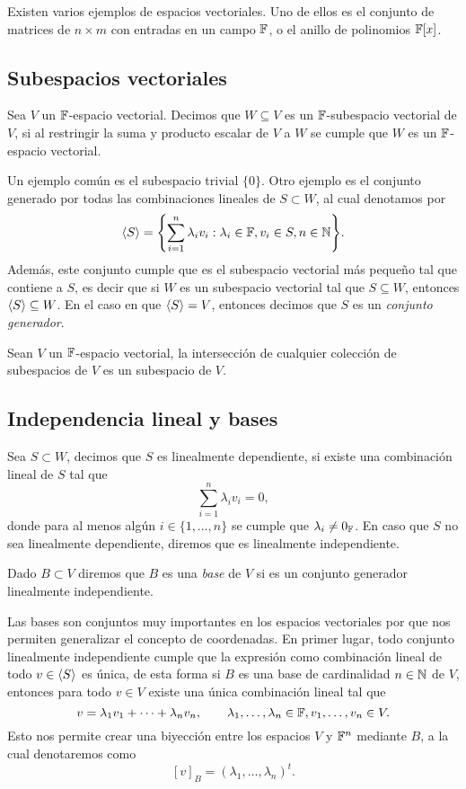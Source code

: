 Existen varios ejemplos de espacios vectoriales. Uno de ellos es el conjunto de matrices de $n \times m $ con entradas en un campo $\mathbb{F}$, o el anillo de polinomios $\mathbb{F}[x]$.

\subsection{Subespacios vectoriales}

\begin{defi}
  Sea $V$ un $\mathbb{F}$-espacio vectorial. Decimos que $W \subseteq V$ es un $\mathbb{F}$-subespacio vectorial de $V$, si al restringir la suma y producto escalar de $V$ a $W$ se cumple que $W$ es un $\mathbb{F}$-espacio vectorial.
\end{defi}

Un ejemplo común es el subespacio trivial $\{0\}$. Otro ejemplo es el conjunto generado por todas las combinaciones lineales de $S \subset W$,  al cual denotamos por
\[ \inner{S} = \set{ \sum_{i=1}^n \lambda_i v_i : \lambda_i \in \F, v_i \in S, n \in \N }. \]
Además, este conjunto cumple que es el subespacio vectorial más pequeño tal que contiene a $S$, es decir que si $W$ es un subespacio vectorial tal que $S \subseteq W$, entonces $\langle S\rangle \subseteq W$. En el caso en que $\langle S\rangle = V$, entonces decimos que $S$ es un \emph{conjunto generador}.

\begin{teor}
  Sean $V$ un $\mathbb{F}$-espacio vectorial, la intersección de cualquier colección de subespacios de $V$ es un subespacio de $V$.
\end{teor}

\subsection{Independencia lineal y bases}

\begin{defi}
  Sea $S \subset W$, decimos que $S$ es linealmente dependiente, si existe una combinación lineal de $S$ tal que
  \[ \sum_{i=1}^n \lambda_i v_i = 0, \]
  donde para al menos algún $i \in \{1,\ldots,n\}$ se cumple que $\lambda_i \neq 0_{\mathbb{F}}$. En caso que $S$ no sea linealmente dependiente, diremos que es linealmente independiente.

  Dado $B \subset V$ diremos que $B$ es una \emph{base} de $V$ si es un conjunto generador linealmente independiente.
\end{defi}

Las bases son conjuntos muy importantes en los espacios vectoriales por que nos permiten generalizar el concepto de coordenadas. En primer lugar, todo conjunto linealmente independiente cumple que la expresión como combinación lineal de todo $v \in \langle S\rangle$ es única, de esta forma si $B$ es una base de cardinalidad $n \in \mathbb{N}$ de $V$, entonces para todo $v \in V$ existe una única combinación lineal tal que 
\[ v = \lambda_1 v_1 + \cdots + \lambda_n v_n, \qquad \lambda_1,\ldots,\lambda_n \in \mathbb{F}, v_1,\ldots,v_n \in V. \]
Esto nos permite crear una biyección entre los espacios $V$ y $\mathbb{F}^n$ mediante $B$, a la cual denotaremos como
\[ [v]_B = (\lambda_1, \ldots, \lambda_n)^t.\]

